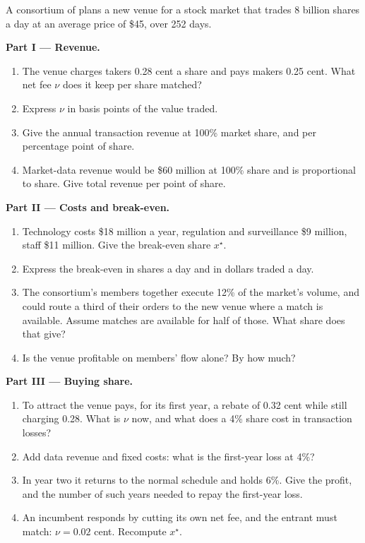 \begin{problem}\label{pb:m1:exchanges-brokers-venues:1}
A consortium of  plans a new venue for a stock market that trades 8
billion shares a day at an average price of \$45, over 252 days.

\medskip\noindent\textbf{Part I --- Revenue.}
\begin{enumerate}
\item The venue charges takers 0.28 cent a share and pays makers 0.25 cent.
What net fee $\nu$ does it keep per share matched?
\item Express $\nu$ in basis points of the value traded.
\item Give the annual transaction revenue at 100\% market share, and per
percentage point of share.
\item Market-data revenue would be \$60 million at 100\% share and is
proportional to share. Give total revenue per point of share.
\end{enumerate}

\medskip\noindent\textbf{Part II --- Costs and break-even.}
\begin{enumerate}[resume]
\item Technology costs \$18 million a year, regulation and surveillance \$9
million, staff \$11 million. Give the break-even share $x^\star$.
\item Express the break-even in shares a day and in dollars traded a day.
\item The consortium's members together execute 12\% of the market's volume,
and could route a third of their orders to the new venue where a match is
available. Assume matches are available for half of those. What share does
that give?
\item Is the venue profitable on members' flow alone? By how much?
\end{enumerate}

\medskip\noindent\textbf{Part III --- Buying share.}
\begin{enumerate}[resume]
\item To attract  the venue pays, for its first year, a rebate
of 0.32 cent while still charging 0.28. What is $\nu$ now, and what does a
4\% share cost in transaction losses?
\item Add data revenue and fixed costs: what is the first-year loss at 4\%?
\item In year two it returns to the normal schedule and holds 6\%. Give the
profit, and the number of such years needed to repay the first-year loss.
\item An incumbent responds by cutting its own net fee, and the entrant must
match: $\nu = 0.02$ cent. Recompute $x^\star$.
\end{enumerate}


\end{problem}
